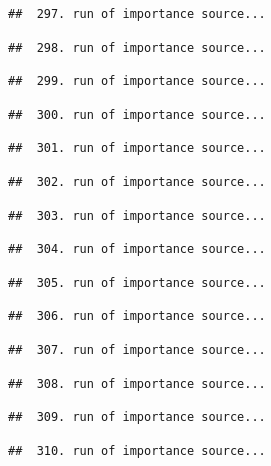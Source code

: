 \documentclass[
]{article}
\begin{document}
\begin{verbatim}
##  297. run of importance source...
\end{verbatim}

\begin{verbatim}
##  298. run of importance source...
\end{verbatim}

\begin{verbatim}
##  299. run of importance source...
\end{verbatim}

\begin{verbatim}
##  300. run of importance source...
\end{verbatim}

\begin{verbatim}
##  301. run of importance source...
\end{verbatim}

\begin{verbatim}
##  302. run of importance source...
\end{verbatim}

\begin{verbatim}
##  303. run of importance source...
\end{verbatim}

\begin{verbatim}
##  304. run of importance source...
\end{verbatim}

\begin{verbatim}
##  305. run of importance source...
\end{verbatim}

\begin{verbatim}
##  306. run of importance source...
\end{verbatim}

\begin{verbatim}
##  307. run of importance source...
\end{verbatim}

\begin{verbatim}
##  308. run of importance source...
\end{verbatim}

\begin{verbatim}
##  309. run of importance source...
\end{verbatim}

\begin{verbatim}
##  310. run of importance source...
\end{verbatim}
\end{document}

